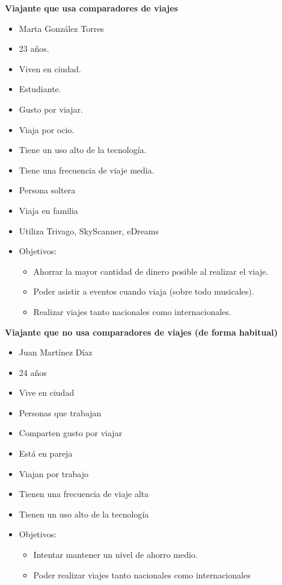 \noindent \textbf{Viajante que usa comparadores de viajes}
\begin{itemize}
    \item Marta González Torres
    \item 23 años.
    \item Viven en ciudad.
    \item Estudiante.
    \item Gusto por viajar.
    \item Viaja por ocio.
    \item Tiene un uso alto de la tecnología.
    \item Tiene una frecuencia de viaje media.
    \item Persona soltera
    \item Viaja en familia
    \item Utiliza Trivago, SkyScanner, eDreams 
    \item Objetivos:
    \begin{itemize}
        \item Ahorrar la mayor cantidad de dinero posible al realizar el viaje.
        \item Poder asistir a eventos cuando viaja (sobre todo musicales).
        \item Realizar viajes tanto nacionales como internacionales.
    \end{itemize}         
\end{itemize}

\noindent \textbf{Viajante que no usa comparadores de viajes (de forma habitual)}
\begin{itemize}
    \item Juan Martínez Díaz
    \item 24 años
    \item Vive en ciudad
    \item Personas que trabajan
    \item Comparten gusto por viajar
    \item Está en pareja
    \item Viajan por trabajo
    \item Tienen una frecuencia de viaje alta
    \item Tienen un uso alto de la tecnología 
    \item Objetivos:
    \begin{itemize}
        \item Intentar mantener un nivel de ahorro medio.
        \item Poder realizar viajes tanto nacionales como internacionales
    \end{itemize}                      
\end{itemize}

